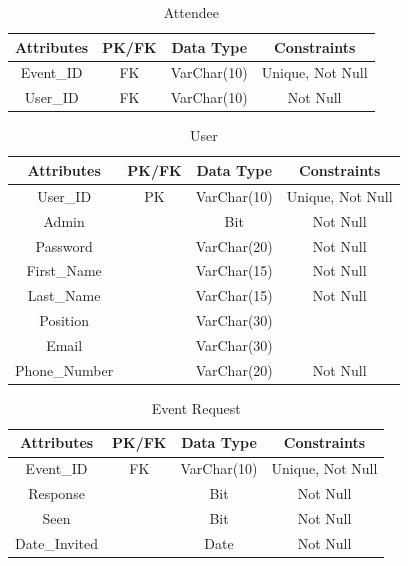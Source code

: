 \documentclass[a4paper]{article}
\begin{document}
\begin{table}[ht]
    \caption{Attendee}
    \centering
    \begin{tabular}{|c|c|c|c|}
        \hline
        Attributes & PK/FK & Data Type & Constraints  \\
        \hline
        Event\_ID & FK & VarChar(10) & Unique, Not Null \\
        \hline
        User\_ID & FK & VarChar(10) & Not Null \\
        \hline
    \end{tabular}
    \label{tab:attendee}
\end{table}

\begin{table}[ht]
    \caption{User}
    \centering
    \begin{tabular}{|c|c|c|c|}
        \hline
        Attributes & PK/FK & Data Type & Constraints  \\
        \hline
        User\_ID & PK & VarChar(10) & Unique, Not Null \\
        \hline
        Admin & & Bit & Not Null \\
        \hline
        Password & & VarChar(20) & Not Null \\
        \hline
        First\_Name & & VarChar(15) & Not Null \\
        \hline
        Last\_Name & & VarChar(15) & Not Null \\
        \hline
        Position & & VarChar(30) & \\
        \hline
        Email & & VarChar(30) & \\
        \hline
        Phone\_Number & & VarChar(20) & Not Null \\
        \hline
    \end{tabular}
    \label{tab:user}
\end{table}

\begin{table}[ht] %
    \caption{Event Request}
    \centering
    \begin{tabular}{|c|c|c|c|}
        \hline
        Attributes & PK/FK & Data Type & Constraints  \\
        \hline
        Event\_ID & FK & VarChar(10) & Unique, Not Null \\
        \hline
        Response & & Bit & Not Null \\
        \hline
        Seen & & Bit & Not Null \\
        \hline
        Date\_Invited & & Date & Not Null \\
        \hline
    \end{tabular}
    \label{tab:event_request}
\end{table}
\end{document}
